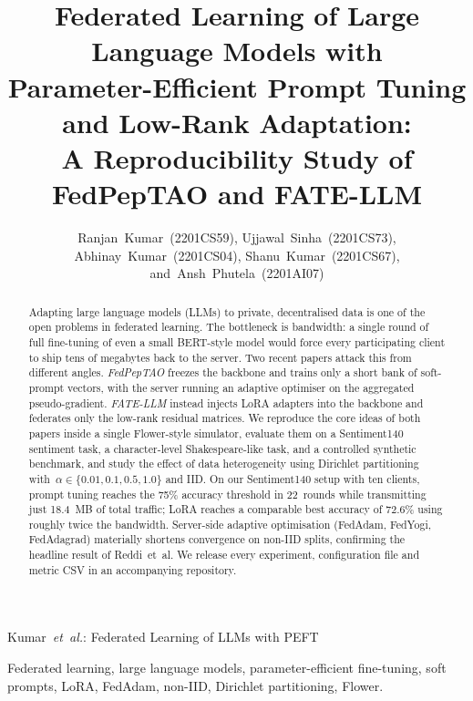 \documentclass[journal]{IEEEtran}
\begin{document}
\title{Federated Learning of Large Language Models with\\
       Parameter-Efficient Prompt Tuning and Low-Rank Adaptation:\\
       A Reproducibility Study of FedPepTAO and FATE-LLM}

\author{Ranjan~Kumar~(2201CS59),
      Ujjawal~Sinha~(2201CS73),
      Abhinay~Kumar~(2201CS04),
      Shanu~Kumar~(2201CS67),
      and~Ansh~Phutela~(2201AI07)}

%
{Kumar~\MakeLowercase{\textit{et~al.}}: Federated Learning of LLMs with PEFT}

\maketitle


\begin{abstract}
Adapting large language models (LLMs) to private, decentralised data is one of
the open problems in federated learning. The bottleneck is bandwidth: a single
round of full fine-tuning of even a small BERT-style model would force every
participating client to ship tens of megabytes back to the server. Two recent
papers attack this from different angles. \emph{FedPepTAO} freezes the
backbone and trains only a short bank of soft-prompt vectors, with the server
running an adaptive optimiser on the aggregated pseudo-gradient. \emph{FATE-LLM}
instead injects LoRA adapters into the backbone and federates only the
low-rank residual matrices. We reproduce the core ideas of both papers inside
a single Flower-style simulator, evaluate them on a Sentiment140 sentiment
task, a character-level Shakespeare-like task, and a controlled synthetic
benchmark, and study the effect of data heterogeneity using Dirichlet
partitioning with~$\alpha \in \{0.01, 0.1, 0.5, 1.0\}$ and IID. On our
Sentiment140 setup with ten clients, prompt tuning reaches the 75\% accuracy
threshold in 22~rounds while transmitting just 18.4~MB of total traffic;
LoRA reaches a comparable best accuracy of 72.6\% using roughly twice the
bandwidth. Server-side adaptive optimisation (FedAdam, FedYogi, FedAdagrad)
materially shortens convergence on non-IID splits, confirming the headline
result of Reddi~et~al. We release every experiment, configuration file and
metric CSV in an accompanying repository.
\end{abstract}

\begin{IEEEkeywords}
Federated learning, large language models, parameter-efficient fine-tuning,
soft prompts, LoRA, FedAdam, non-IID, Dirichlet partitioning, Flower.
\end{IEEEkeywords}
\end{document}
